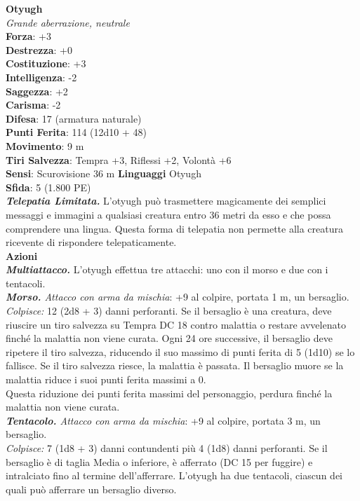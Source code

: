 \begin{multicols}{2}
\medskip\textbf{Otyugh}\\
\emph{Grande aberrazione, neutrale}\\
\textbf{Forza}: +3\\
\textbf{Destrezza}: +0\\
\textbf{Costituzione}: +3\\
\textbf{Intelligenza}: -2\\
\textbf{Saggezza}: +2\\
\textbf{Carisma}: -2\\
\textbf{Difesa}: 17 (armatura naturale)\\
\textbf{Punti Ferita}: 114 (12d10 + 48)\\
\textbf{Movimento}: 9 m\\
\textbf{Tiri Salvezza}: Tempra +3, Riflessi +2, Volontà +6\\
\textbf{Sensi}: Scurovisione 36 m
\textbf{Linguaggi} Otyugh\\
\textbf{Sfida}: 5 (1.800 PE)\smallskip\\
\emph{\textbf{Telepatia Limitata.}} L'otyugh può trasmettere magicamente dei semplici messaggi e immagini a qualsiasi creatura entro 36 metri da esso e che possa comprendere una lingua. Questa forma di telepatia non permette alla creatura ricevente di rispondere telepaticamente.\\
\smallskip\textbf{Azioni}\\
\emph{\textbf{Multiattacco.}} L'otyugh effettua tre attacchi: uno con il morso e due con i tentacoli.\\
\emph{\textbf{Morso.} Attacco con arma da mischia}: +9 al colpire, portata 1 m, un bersaglio.\\

\emph{Colpisce:} 12 (2d8 + 3) danni perforanti. Se il bersaglio è una creatura, deve riuscire un tiro salvezza su Tempra DC  18 contro malattia o restare avvelenato finché la malattia non viene curata. Ogni 24 ore successive, il bersaglio deve ripetere il tiro salvezza, riducendo il suo massimo di punti ferita di 5 (1d10) se lo fallisce. Se il tiro salvezza riesce, la malattia è passata. Il bersaglio muore se la malattia riduce i suoi punti ferita massimi a 0.\\
Questa riduzione dei punti ferita massimi del personaggio, perdura  finché la malattia non viene curata.\\
\emph{\textbf{Tentacolo.} Attacco con arma da mischia}: +9 al colpire, portata 3 m, un bersaglio.\\
\emph{Colpisce:} 7 (1d8 + 3) danni contundenti più 4 (1d8) danni perforanti. Se il bersaglio è di taglia Media o inferiore, è afferrato (DC  15 per fuggire) e intralciato fino al termine dell'afferrare. L'otyugh ha due tentacoli, ciascun dei quali può afferrare un bersaglio diverso.\\


\end{multicols}
